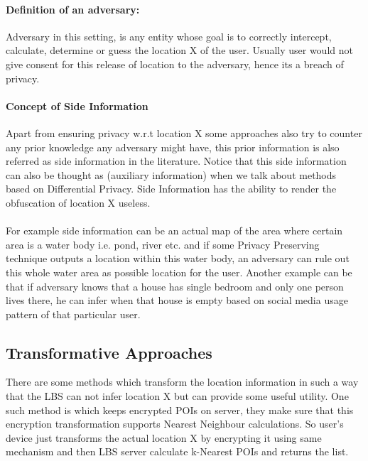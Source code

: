 \documentclass[12pt]{report}
\theoremstyle{named}
\begin{document}
\paragraph{Definition of an adversary:}
Adversary in this setting, is any entity whose goal is to correctly intercept, calculate, determine or guess the location X of the user. Usually user would not give consent for this release of location to the adversary, hence its a breach of privacy.

\paragraph{Concept of Side Information}
Apart from ensuring privacy w.r.t location X some approaches also try to counter any prior knowledge any adversary might have, this prior information is also referred as side information in the literature. Notice that this side information can also be thought as (auxiliary information) when we talk about methods based on Differential Privacy. Side Information has the ability to render the obfuscation of location X useless. 


\paragraph{}
For example side information can be an actual map of the area where certain area is a water body i.e. pond, river etc. and if some Privacy Preserving technique outputs a location within this water body, an adversary can rule out this whole water area as possible location for the user. Another example can be that if adversary knows that a house has single bedroom and only one person lives there, he can infer when that house is empty based on social media usage pattern of that particular user.

\subsection{Transformative Approaches}
There are some methods which transform the location information in such a way that the LBS can not infer location X but can provide some useful utility. One such method is \cite{khoshgozaran2007blind} which keeps encrypted POIs on server, they make sure that this encryption transformation supports Nearest Neighbour calculations. So user's device just transforms the actual location X by encrypting it using same mechanism and then LBS server calculate k-Nearest POIs and returns the list.
\end{document}
